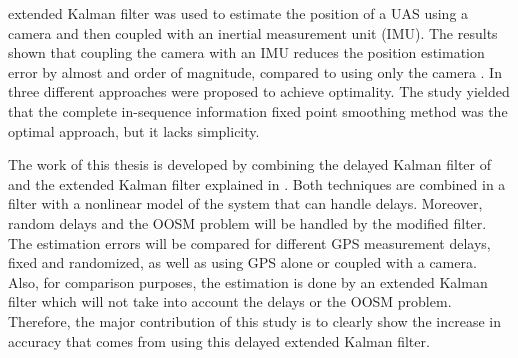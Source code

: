 extended Kalman filter was used to estimate the position of a UAS using a camera and then coupled with an inertial measurement unit (IMU). The results shown that coupling the camera with an IMU reduces the position estimation error by almost and order of magnitude, compared to using only the camera \cite{Kelly2008}. In \cite{Zhang2012} three different approaches were proposed to achieve optimality. The study yielded that the complete in-sequence information fixed point smoothing method was the optimal approach, but it lacks simplicity. 

The work of this thesis is developed by combining the delayed Kalman filter of \cite{Larsen1998} and the extended Kalman filter explained in \cite{Beard2010a}. Both techniques are combined in a filter with a nonlinear model of the system that can handle delays. Moreover, random delays and the OOSM problem will be handled by the modified filter. The estimation errors will be compared for different GPS measurement delays, fixed and randomized, as well as using GPS alone or coupled with a camera. Also, for comparison purposes, the estimation is done by an extended Kalman filter which will not take into account the delays or the OOSM problem. Therefore, the major contribution of this study is to clearly show the increase in accuracy that comes from using this delayed extended Kalman filter.